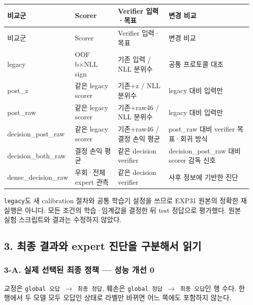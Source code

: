 \endgroup
\begingroup
\footnotesize
\begin{longtable}{>{\raggedright\arraybackslash}p{}>{\raggedright\arraybackslash}p{}>{\raggedright\arraybackslash}p{}>{\raggedright\arraybackslash}p{}}
\toprule
비교군 & Scorer & Verifier 입력·목표 & 변경 비교 \\ \midrule
\endfirsthead
비교군 & Scorer & Verifier 입력·목표 & 변경 비교 \\ \midrule
\endhead
{}legacy & OOF b×NLL sign & 기존 입력 /\allowbreak{} NLL 분위수 & 공통 프로토콜 대조 \\
{}post\_\allowbreak{}z & 같은 legacy scorer & 기존+\allowbreak{}z /\allowbreak{} NLL 분위수 & legacy 대비 입력만 \\
{}post\_\allowbreak{}raw & 같은 legacy scorer & 기존+\allowbreak{}raw46 /\allowbreak{} NLL 분위수 & legacy 대비 입력만 \\
{}decision\_\allowbreak{}post\_\allowbreak{}raw & 같은 legacy scorer & 기존+\allowbreak{}raw46 /\allowbreak{} 결정 손익 평균 & post\_\allowbreak{}raw 대비 verifier 목표·회귀 방식 \\
{}decision\_\allowbreak{}both\_\allowbreak{}raw & 결정 손익 평균 & 같은 decision verifier & decision\_\allowbreak{}post\_\allowbreak{}raw 대비 scorer 감독 신호 \\
{}dense\_\allowbreak{}decision\_\allowbreak{}raw & 우회·전체 expert 관측 & 같은 decision verifier & 사후 정보에 기반한 진단 \\
\bottomrule
\end{longtable}
\endgroup
\texttt{legacy}도 새 calibration 절차와 공통 학습기 설정을 쓰므로 EXP31 원본의 정확한 재실행은 아니다. 모든 조건의 학습·임계값을 결정한 뒤 test 정답으로 평가했다. 원본 실험 스크립트와 결과는 수정하지 않았다.

\subsection{3. 최종 결과와 expert 진단을 구분해서 읽기}
\subsubsection{3-A. 실제 선택된 최종 정책 — 성능 개선 0}
교정은 \texttt{global 오\allowbreak{}답   \ensuremath{\rightarrow}   최종\allowbreak{} 정답}, 훼손은 \texttt{global 정\allowbreak{}답   \ensuremath{\rightarrow}   최종\allowbreak{} 오답}인 행 수다. 한 행에서 두 모델 모두 오답인 상태로 라벨만 바뀌면 어느 쪽에도 포함하지 않는다.

